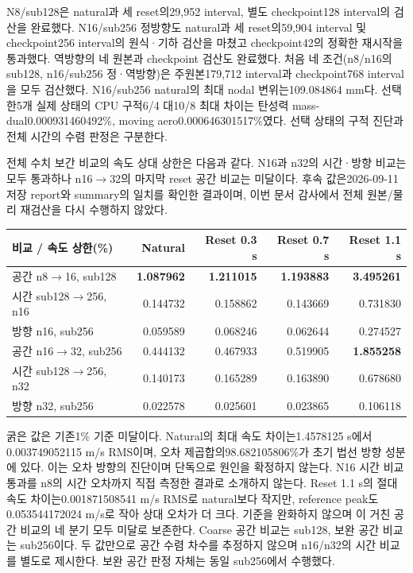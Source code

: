 \documentclass[10pt]{article}
\begin{document}
N8/sub128은 natural과 세 reset의29,952 interval, 별도 checkpoint128 interval의 검산을 완료했다.
N16/sub256 정방향도 natural과 세 reset의59,904 interval 및 checkpoint256 interval의
원식·기하 검산을 마쳤고 checkpoint42의 정확한 재시작을 통과했다.
역방향의 네 원본과 checkpoint 검산도 완료했다. 처음 네 조건(n8/n16의 sub128,
n16/sub256 정·역방향)은 주원본179,712 interval과 checkpoint768 interval을 모두 검산했다.
N16/sub256 natural의 최대 nodal 변위는109.084864 mm다. 선택한5개 실제 상태의 CPU 구적6/4 대10/8 최대 차이는
탄성력 mass-dual0.000931460492\%, moving aero0.000646301517\%였다.
선택 상태의 구적 진단과 전체 시간의 수렴 판정은 구분한다.

전체 수치 보간 비교의 속도 상대 상한은 다음과 같다. N16과 n32의 시간·방향 비교는
모두 통과하나 n16$\to$32의 마지막 reset 공간 비교는 미달이다. 후속 값은2026-09-11 저장 report와
summary의 일치를 확인한 결과이며, 이번 문서 감사에서 전체 원본/물리 재검산을 다시 수행하지 않았다.
\begin{center}
\begin{tabular}{lrrrr}
\toprule 비교 / 속도 상한(\%) & Natural & Reset 0.3 s & Reset 0.7 s & Reset 1.1 s\\\midrule
공간 n8$\to$16, sub128 & \textbf{1.087962} & \textbf{1.211015} & \textbf{1.193883} & \textbf{3.495261}\\
시간 sub128$\to$256, n16 & 0.144732 & 0.158862 & 0.143669 & 0.731830\\
방향 n16, sub256 & 0.059589 & 0.068246 & 0.062644 & 0.274527\\
공간 n16$\to$32, sub256 & 0.444132 & 0.467933 & 0.519905 & \textbf{1.855258}\\
시간 sub128$\to$256, n32 & 0.140173 & 0.165289 & 0.163890 & 0.678680\\
방향 n32, sub256 & 0.022578 & 0.025601 & 0.023865 & 0.106118\\
\bottomrule\end{tabular}\end{center}
굵은 값은 기존1\% 기준 미달이다. Natural의 최대 속도 차이는1.4578125 s에서
0.003749052115 m/s RMS이며, 오차 제곱합의98.682105806\%가 초기 법선 방향 성분에 있다.
이는 오차 방향의 진단이며 단독으로 원인을 확정하지 않는다. N16 시간 비교 통과를 n8의 시간
오차까지 직접 측정한 결과로 소개하지 않는다.
Reset 1.1 s의 절대 속도 차이는0.001871508541 m/s RMS로 natural보다 작지만,
reference peak도0.053544172024 m/s로 작아 상대 오차가 더 크다. 기준을 완화하지 않으며
이 거친 공간 비교의 네 분기 모두 미달로 보존한다.
Coarse 공간 비교는 sub128, 보완 공간 비교는 sub256이다. 두 값만으로 공간 수렴 차수를
추정하지 않으며 n16/n32의 시간 비교를 별도로 제시한다. 보완 공간 판정 자체는 동일 sub256에서 수행했다.
\end{document}
